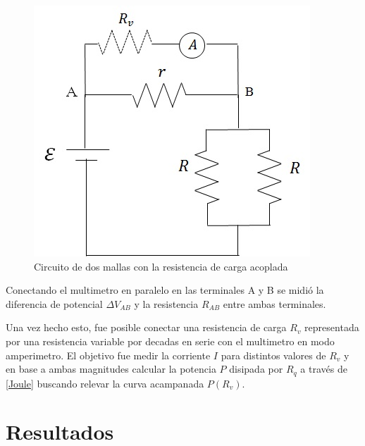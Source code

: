\documentclass[11pt,a4paper]{article}
\begin{document}
\begin{figure}[h]
  \centering
  \includegraphics[scale=0.55]{Mallas_con_carga}
  \caption{Circuito de dos mallas con la resistencia de carga acoplada}
  \label{fig:circ_mallas_carga}
\end{figure}



Conectando el multimetro en paralelo en las terminales A y B se midió la diferencia de potencial $\Delta V_{AB}$ y la resistencia $R_{AB}$  entre ambas terminales.

Una vez hecho esto, fue posible conectar una resistencia de carga $R_v$ representada por una resistencia variable por decadas en serie con el multimetro en modo amperimetro. El objetivo fue medir la corriente $I$ para distintos valores de $R_v$ y en base a ambas magnitudes calcular la potencia $P$ disipada por $R_q$ a través de \eqref{Joule} buscando relevar la curva acampanada $P(R_v)$.




\section{Resultados}
\label{sec:discusion}
\end{document}
